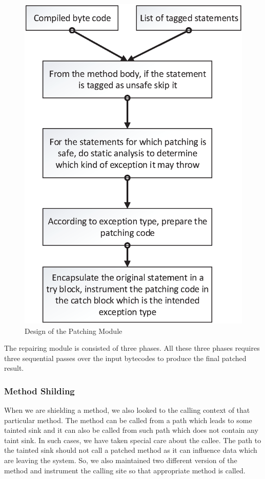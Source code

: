 \begin{figure}
\centering
  \includegraphics[scale= .5]{images/PatchModule.eps}
  \caption{Design of the Patching Module}
  \label{fig:PatchModule}
\end{figure}

The repairing module is consisted of three phases. All these three phases
requires three sequential passes over the input bytecodes to produce the final
patched result.


\subsubsection{Method Shilding}
\label{MethodShilding}


When we are shielding a method, we also looked to the calling context of that
particular method. The method can be called from a path which leads to some
tainted sink and it can also be called from such path which does not contain
any taint sink. In such cases, we have taken special care about the callee. The
path to the tainted sink should not call a patched method as it can influence
data which are leaving the system. So, we also maintained two different version of
the method and instrument the calling site so that appropriate method is called.

